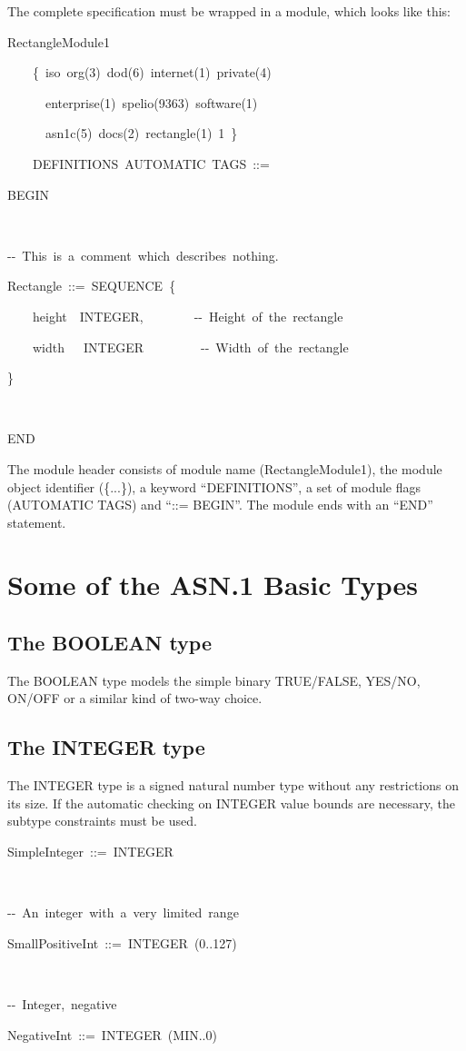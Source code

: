 \documentclass[english,oneside,12pt]{book}
\newenvironment{lyxcode}
{\par\begin{list}{}{
\setlength{\rightmargin}{\leftmargin}
\setlength{\listparindent}{0pt}%
\raggedright
\setlength{\itemsep}{0pt}
\setlength{\parsep}{0pt}
\normalfont\ttfamily}%
 \item[]}
{\end{list}}
\begin{document}
The complete specification must be wrapped in a module, which looks
like this:
\begin{lyxcode}
RectangleModule1

~~~~\{~iso~org(3)~dod(6)~internet(1)~private(4)

~~~~~~enterprise(1)~spelio(9363)~software(1)

~~~~~~asn1c(5)~docs(2)~rectangle(1)~1~\}~

~~~~DEFINITIONS~AUTOMATIC~TAGS~::=

BEGIN

~

-{}-~This~is~a~comment~which~describes~nothing.

Rectangle~::=~SEQUENCE~\{

~~~~height~~INTEGER,~~~~~~~~-{}-~Height~of~the~rectangle

~~~~width~~~INTEGER~~~~~~~~~-{}-~Width~of~the~rectangle

\}

~

END
\end{lyxcode}
The module header consists of module name (RectangleModule1), the
module object identifier (\{...\}), a keyword ``DEFINITIONS'', a
set of module flags (AUTOMATIC TAGS) and ``::= BEGIN''. The module
ends with an ``END'' statement.


\section{Some of the ASN.1 Basic Types}


\subsection{The BOOLEAN type}

The BOOLEAN type models the simple binary TRUE/FALSE, YES/NO, ON/OFF
or a similar kind of two-way choice.


\subsection{The INTEGER type}

The INTEGER type is a signed natural number type without any restrictions
on its size. If the automatic checking on INTEGER value bounds are
necessary, the subtype constraints must be used.
\begin{lyxcode}
SimpleInteger~::=~INTEGER

~

-{}-~An~integer~with~a~very~limited~range

SmallPositiveInt~::=~INTEGER~(0..127)

~

-{}-~Integer,~negative

NegativeInt~::=~INTEGER~(MIN..0)
\end{lyxcode}
\end{document}
